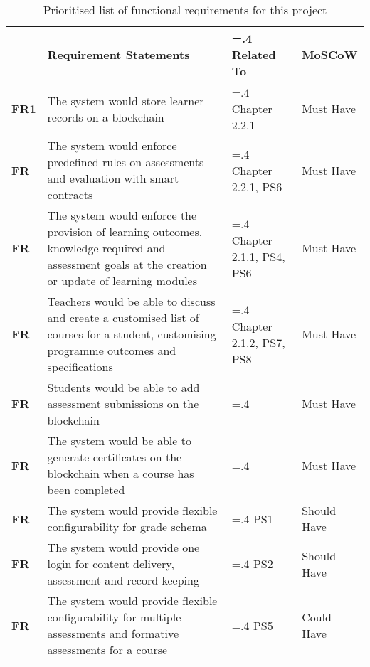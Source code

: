 \begin{table}[!h] 
    \caption{Prioritised list of functional requirements for this project}
    \centering
    \label{table:formal-reqs}
    \begin{tabularx}{\textwidth}{>{\bfseries}l>{\hsize=1.6\hsize}X>{\hsize=.4\hsize}Xl}
        & Requirement Statements & Related To & MoSCoW\\
        \toprule
        FR1 & The system would store learner records on a blockchain 
        & Chapter 2.2.1 & Must Have\\\midrule
        FR & The system would enforce predefined rules on assessments and evaluation with 
        smart contracts & Chapter 2.2.1, PS6 & Must Have\\\midrule
        FR & The system would enforce the provision of learning outcomes, knowledge required 
        and assessment goals at the creation or update of learning modules & Chapter 2.1.1, 
        PS4, PS6 & Must Have\\\midrule
        FR & Teachers would be able to discuss and create a customised list of courses 
        for a student, customising programme outcomes and specifications 
        & Chapter 2.1.2, PS7, PS8 & Must Have\\\midrule
        FR & Students would be able to add assessment submissions on the blockchain 
        &  & Must Have\\\midrule
        FR & The system would be able to generate certificates on the blockchain when a course 
        has been completed &  & Must Have\\\midrule
        FR & The system would provide flexible configurability for grade schema & PS1
        & Should Have\\\midrule
        FR & The system would provide one login for content delivery, assessment and 
        record keeping & PS2 & Should Have\\\midrule
        FR & The system would provide flexible configurability for multiple assessments and 
        formative assessments for a course & PS5 & Could Have\\
        \bottomrule
    \end{tabularx}
\end{table}
